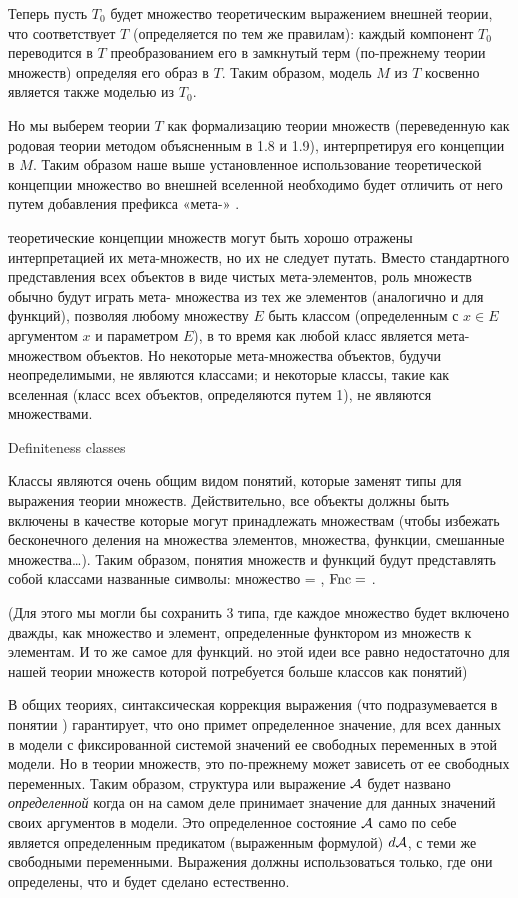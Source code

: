 Теперь пусть $T_0$ будет множество теоретическим выражением внешней теории, что соответствует $T$ (определяется по тем же правилам): каждый компонент $T_0$ переводится в $T$ преобразованием его в замкнутый терм (по-прежнему теории множеств) определяя его образ в $T$. 
Таким образом, модель $M$ из $T$ косвенно является также моделью из $T_0$. 

Но мы выберем теории $T$ как формализацию теории множеств (переведенную как родовая теории методом объясненным в 1.8 и 1.9), интерпретируя его концепции в $M$. Таким образом наше выше установленное использование теоретической концепции множество во внешней вселенной необходимо будет отличить от него путем добавления префикса «мета-» .

теоретические концепции множеств могут быть хорошо отражены интерпретацией их мета-множеств, но их не следует путать. Вместо стандартного представления всех объектов в виде чистых мета-элементов, роль множеств  обычно будут играть мета- множества из тех же элементов (аналогично и для функций), позволяя любому множеству $E$ быть классом (определенным с $x\in E$  аргументом $x$ и параметром $E$), в то время как любой класс является мета-множеством объектов. Но некоторые мета-множества объектов, будучи неопределимыми, не являются классами; и некоторые классы, такие как вселенная (класс всех объектов, определяются путем 1), не являются множествами. 

{\sst Definiteness classes}

Классы являются очень общим видом понятий, которые заменят типы для выражения теории множеств. Действительно, все объекты должны быть включены в качестве  которые могут принадлежать множествам (чтобы избежать бесконечного деления на множества элементов, множества, функции, смешанные множества\dots). Таким образом, понятия множеств и функций будут представлять собой классами названные символы: множество = , $\mathop{\rm Fnc} =$ .

(Для этого мы могли бы сохранить 3 типа, где каждое множество будет включено дважды, как множество и элемент, определенные функтором из множеств к элементам. И то же самое для функций. но этой идеи все равно недостаточно для нашей теории множеств которой потребуется больше классов как понятий)

В общих теориях, синтаксическая коррекция выражения (что подразумевается в понятии ) гарантирует, что оно примет определенное значение, для всех данных в модели с фиксированной системой значений ее свободных переменных в этой модели. Но в теории множеств, это по-прежнему может зависеть от ее свободных переменных. Таким образом, структура или выражение ${\cal A}$ будет названо {\it определенной} когда он на самом деле принимает значение для данных значений своих аргументов в модели. Это определенное состояние ${\cal A} $ само по себе является определенным предикатом (выраженным формулой) $d{\cal A}$, с теми же свободными переменными. Выражения должны использоваться только, где они определены, что и будет сделано естественно. 


